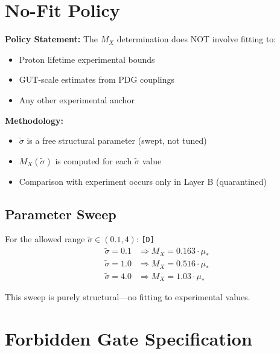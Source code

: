 \documentclass[11pt,a4paper]{article}
\newcommand{\tagD}{\textcolor{green!50!black}{\texttt{[D]}}}
\theoremstyle{definition}
\begin{document}
\section{No-Fit Policy}
\label{sec:no-fit}

\begin{nofitbox}
\textbf{Policy Statement:}
The $M_X$ determination does NOT involve fitting to:
\begin{itemize}
  \item Proton lifetime experimental bounds
  \item GUT-scale estimates from PDG couplings
  \item Any other experimental anchor
\end{itemize}

\textbf{Methodology:}
\begin{itemize}
  \item $\tilde{\sigma}$ is a free structural parameter (swept, not tuned)
  \item $M_X(\tilde{\sigma})$ is computed for each $\tilde{\sigma}$ value
  \item Comparison with experiment occurs only in Layer B (quarantined)
\end{itemize}
\end{nofitbox}

\subsection{Parameter Sweep}
\label{subsec:param-sweep}

For the allowed range $\tilde{\sigma} \in (0.1, 4)$: \tagD{}
\begin{align}
\label{eq:mx-sweep-low}
\tilde{\sigma} = 0.1 &\Rightarrow M_X = 0.163 \cdot \mu_* \\
\label{eq:mx-sweep-mid}
\tilde{\sigma} = 1.0 &\Rightarrow M_X = 0.516 \cdot \mu_* \\
\label{eq:mx-sweep-high}
\tilde{\sigma} = 4.0 &\Rightarrow M_X = 1.03 \cdot \mu_*
\end{align}

This sweep is purely structural---no fitting to experimental values.


\section{Forbidden Gate Specification}
\label{sec:forbidden-gate}
\end{document}
